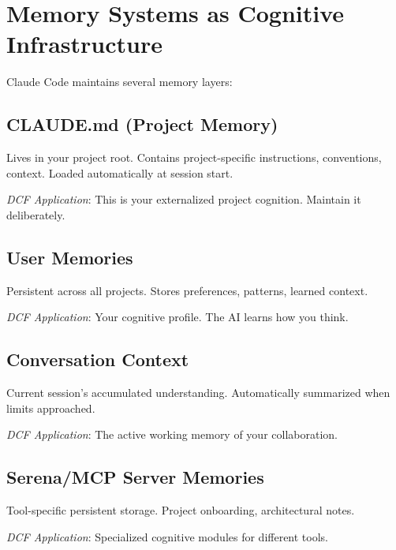 \chapter{Memory Systems as Cognitive Infrastructure}

Claude Code maintains several memory layers:

\section{CLAUDE.md (Project Memory)}

Lives in your project root. Contains project-specific instructions, conventions, context. Loaded automatically at session start.

\emph{DCF Application}: This is your externalized project cognition. Maintain it deliberately.

\section{User Memories}

Persistent across all projects. Stores preferences, patterns, learned context.

\emph{DCF Application}: Your cognitive profile. The AI learns how you think.

\section{Conversation Context}

Current session's accumulated understanding. Automatically summarized when limits approached.

\emph{DCF Application}: The active working memory of your collaboration.

\section{Serena/MCP Server Memories}

Tool-specific persistent storage. Project onboarding, architectural notes.

\emph{DCF Application}: Specialized cognitive modules for different tools.

